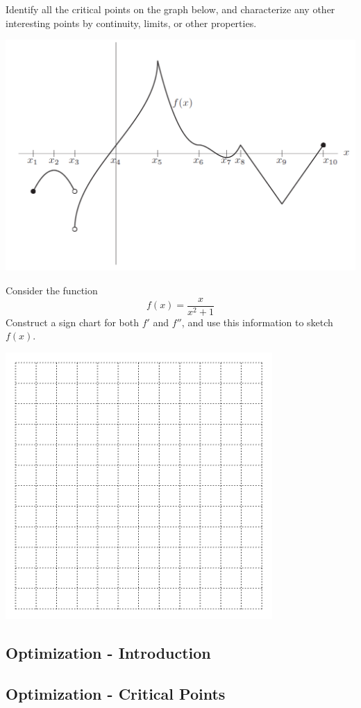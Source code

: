 \newpage

\problem Identify all the critical points on the graph below, and
  characterize any other interesting points by continuity, limits, or
  other properties.

\includegraphics[width=8in]{graphics/notes06_crit_pnt_oddities}

\newpage


\problem Consider the function  
$$f(x) = \frac{x}{x^2 + 1}$$
Construct a sign chart for both $f'$ and $f''$, and use this information to
sketch $f(x)$.

\vfill
\newpage
\vfill

\hfill \includegraphics[width=4in]{graphics/empty_graph_square_12}

\newpage
{}
\subsection*{Optimization - Introduction}

\newpage
{}
\subsection*{Optimization - Critical Points}






